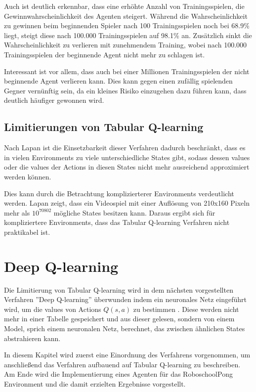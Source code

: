 \documentclass[11pt]{scrartcl}
\begin{document}
Auch ist deutlich erkennbar, dass eine erhöhte Anzahl von Trainingsspielen, die
Gewinnwahrscheinlichkeit des Agenten steigert. Während die Wahrscheinlichkeit zu gewinnen
beim beginnenden Spieler nach 100 Trainingsspielen noch bei 68.9\% liegt, steigt diese nach
100.000 Trainingsspielen auf 98.1\% an. Zusätzlich sinkt die Wahrscheinlichkeit zu verlieren mit
zunehmendem Training, wobei nach 100.000 Trainingsspielen der beginnende Agent nicht mehr zu
schlagen ist.

Interessant ist vor allem, dass auch bei einer Millionen Trainingsspielen der nicht
beginnende Agent verlieren kann. Dies kann gegen einen zufällig spielenden Gegner
vernünftig sein, da ein kleines Risiko einzugehen dazu führen kann, dass deutlich häufiger
gewonnen wird.


\subsection{Limitierungen von Tabular Q-learning}
\label{sec:tabular_q_learning_limits}
Nach Lapan\cite[~S.192]{L2018} ist die Einsetzbarkeit dieser Verfahren dadurch
beschränkt, dass es in vielen Environments zu viele unterschiedliche States gibt, sodass
dessen values oder die values der Actions in diesen States nicht mehr ausreichend
approximiert werden können.

Dies kann durch die Betrachtung komplizierterer Environments verdeutlicht werden. Lapan
\cite[~S.192]{L2018} zeigt, dass ein Videospiel mit einer Auflösung von 210x160 Pixeln
mehr als $10^{70802}$ mögliche States besitzen kann. Daraus ergibt sich für
kompliziertere Environments, dass das Tabular Q-learning Verfahren nicht praktikabel ist.


\section{Deep Q-learning}
\label{sec:dqn}
Die Limitierung von Tabular Q-learning wird in dem nächsten vorgestellten Verfahren
''Deep Q-learning'' überwunden indem ein neuronales Netz eingeführt wird, um die values
von Actions $Q(s, a)$ zu bestimmen \cite[~S.199 ff.]{L2018}. Diese werden nicht mehr in
einer Tabelle gespeichert und aus dieser gelesen, sondern von einem Model, sprich einem
neuronalen Netz, berechnet, das zwischen ähnlichen States abstrahieren kann.

In diesem Kapitel wird zuerst eine Einordnung des Verfahrens vorgenommen, um anschließend
das Verfahren aufbauend auf Tabular Q-learning zu beschreiben. Am Ende wird die
Implementierung eines Agenten für das RoboschoolPong Environment und die damit erzielten
Ergebnisse vorgestellt.
\end{document}
